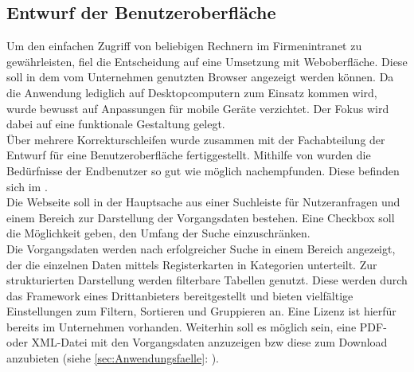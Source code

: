 \subsection{Entwurf der Benutzeroberfläche}
\label{sec:Benutzeroberflaeche} 
Um den einfachen Zugriff von beliebigen Rechnern im Firmenintranet zu gewährleisten,
fiel die Entscheidung auf eine Umsetzung mit Weboberfläche. Diese soll in dem vom Unternehmen genutzten Browser angezeigt werden können.
Da die Anwendung lediglich auf Desktopcomputern zum Einsatz kommen wird, wurde bewusst auf Anpassungen für mobile Geräte verzichtet.
Der Fokus wird dabei auf eine funktionale Gestaltung gelegt.\\
Über mehrere Korrekturschleifen wurde zusammen mit der Fachabteilung der Entwurf für eine Benutzeroberfläche
fertiggestellt. Mithilfe von  wurden die Bedürfnisse der Endbenutzer so gut wie möglich nachempfunden.
Diese befinden sich im .\\
Die Webseite soll in der Hauptsache aus einer Suchleiste für Nutzeranfragen und einem Bereich zur Darstellung der Vorgangsdaten
bestehen. Eine Checkbox soll die Möglichkeit geben, den Umfang der Suche einzuschränken.\\
Die Vorgangsdaten werden nach erfolgreicher Suche in einem Bereich angezeigt, der die einzelnen Daten mittels Registerkarten
in Kategorien unterteilt. Zur strukturierten Darstellung werden filterbare Tabellen genutzt. Diese werden durch das
Framework  eines Drittanbieters bereitgestellt und bieten vielfältige Einstellungen zum Filtern,
Sortieren und Gruppieren an. Eine Lizenz ist hierfür bereits im Unternehmen vorhanden.
Weiterhin soll es möglich sein, eine \acs{PDF}- oder \acs{XML}-Datei mit den Vorgangsdaten anzuzeigen \acs{bzw} diese zum 
Download anzubieten (siehe \ref{sec:Anwendungsfaelle}: ).

